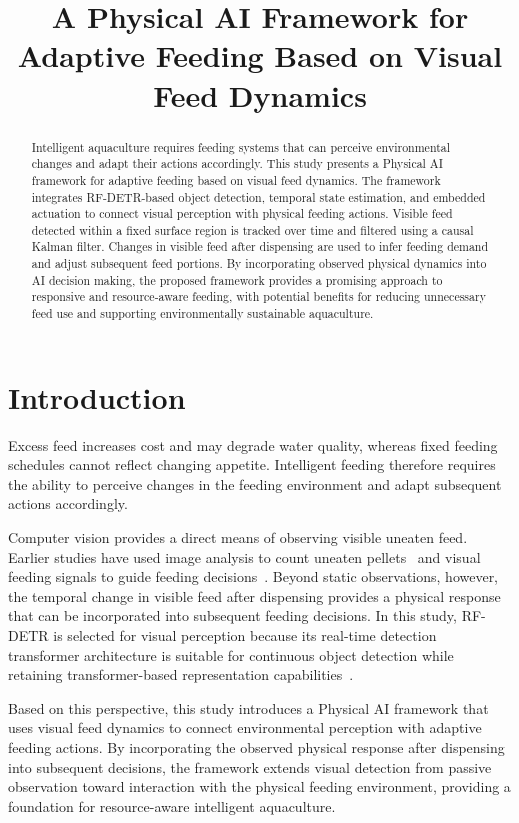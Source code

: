 \documentclass[10pt,conference,letterpaper]{IEEEtran}
\title{A Physical AI Framework for Adaptive Feeding Based on Visual Feed Dynamics}
\author{\IEEEauthorblockN{\fontsize{11}{13}\selectfont Sin-Ze Yang, Cheng-Hsun Chuang, Yong-Xiang Chen\textsuperscript{*}}
\IEEEauthorblockA{\fontsize{10}{12}\selectfont\itshape Undergraduate Program in Intelligent Computing and Big Data\\
Chung Yuan Christian University, Taiwan\\
{\fontsize{9}{11}\selectfont\normalfont\ttfamily *Contact: yxchen@cycu.edu.tw}}}
\begin{document}
\maketitle
\begin{abstract}
Intelligent aquaculture requires feeding systems that can perceive environmental changes and adapt their actions accordingly. This study presents a Physical AI framework for adaptive feeding based on visual feed dynamics. The framework integrates RF-DETR-based object detection, temporal state estimation, and embedded actuation to connect visual perception with physical feeding actions. Visible feed detected within a fixed surface region is tracked over time and filtered using a causal Kalman filter. Changes in visible feed after dispensing are used to infer feeding demand and adjust subsequent feed portions. By incorporating observed physical dynamics into AI decision making, the proposed framework provides a promising approach to responsive and resource-aware feeding, with potential benefits for reducing unnecessary feed use and supporting environmentally sustainable aquaculture.
\end{abstract}
\section{Introduction}
Excess feed increases cost and may degrade water quality, whereas fixed feeding schedules cannot reflect changing appetite. Intelligent feeding therefore requires the ability to perceive changes in the feeding environment and adapt subsequent actions accordingly.

Computer vision provides a direct means of observing visible uneaten feed. Earlier studies have used image analysis to count uneaten pellets~\cite{foster1995} and visual feeding signals to guide feeding decisions~\cite{liu2014,zhou2018}. Beyond static observations, however, the temporal change in visible feed after dispensing provides a physical response that can be incorporated into subsequent feeding decisions. In this study, RF-DETR is selected for visual perception because its real-time detection transformer architecture is suitable for continuous object detection while retaining transformer-based representation capabilities~\cite{robinson2026}.

Based on this perspective, this study introduces a Physical AI framework that uses visual feed dynamics to connect environmental perception with adaptive feeding actions. By incorporating the observed physical response after dispensing into subsequent decisions, the framework extends visual detection from passive observation toward interaction with the physical feeding environment, providing a foundation for resource-aware intelligent aquaculture.
\end{document}
